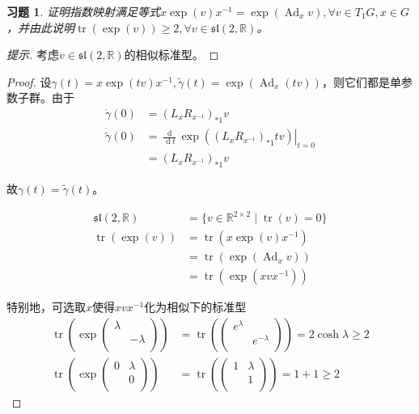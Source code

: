 \documentclass[winfonts,UTF8,c5size,a4paper,fancyhdr,hyperref,titlepage,nocap]{ctexart}
\newtheorem{xiti}{习题}
\theoremstyle{definition}
\theoremstyle{remark}
\numberwithin{equation}{subsection}
\newcommand{\Real}{\mathbb{R}}
\newcommand{\dt}{\frac{\operatorname{d}}{\operatorname{d}t}}
\newcommand{\tr}{\operatorname{tr}}
\newcommand{\local}[2]{\left.{#1}\right|_{#2}}%
\newcommand{\localt}[1]{\local{#1}{t=0}}%
\newcommand{\Ad}{\operatorname{Ad}}
\begin{document}
\begin{xiti}
  证明指数映射满足等式$x\exp(v)x^{-1}=\exp(\Ad_xv), \forall v\in T_1G,x\in G$，并由此说明$\tr(\exp(v))\geqslant2, \forall v\in\mathfrak{sl}(2,\Real)$。
\end{xiti}
\begin{proof}[提示]
  考虑$v\in\mathfrak{sl}(2,\Real)$的相似标准型。
\end{proof}
\begin{proof}
  设$\gamma(t)=x\exp(tv)x^{-1}, \widetilde{\gamma}(t)=\exp(\Ad_x(tv))$，则它们都是单参数子群。由于
  \begin{align*}
     \dot{\gamma}(0)&=(L_{x}R_{x^{-1}})_{\ast1}v\\
     \dot{\widetilde{\gamma}}(0)&=\localt{\dt\exp((L_{x}R_{x^{-1}})_{\ast1}tv)}\\
                            &=(L_{x}R_{x^{-1}})_{\ast1}v
  \end{align*}

  故$\gamma(t)=\widetilde{\gamma}(t)$。

  \begin{align*}
    \mathfrak{sl}(2,\Real)&=\{v\in\Real^{2\times 2}\mid\tr(v)=0\}\\
    \tr(\exp(v))&=\tr(x\exp(v)x^{-1})\\
                    &=\tr(\exp(\Ad_xv))\\
                    &=\tr(\exp(xvx^{-1}))
  \end{align*}

  特别地，可选取$x$使得$xvx^{-1}$化为相似下的标准型
  \begin{align*}
    \tr(\exp\begin{pmatrix}
       \lambda &  \\
        & -\lambda \\
     \end{pmatrix})
     &=\tr(\begin{pmatrix}
        e^{\lambda} &  \\
         & e^{-\lambda} \\
      \end{pmatrix})
      =2\cosh\lambda\geqslant2\\
    \tr(\exp\begin{pmatrix}
       0 & \lambda \\
        & 0 \\
     \end{pmatrix})
     &=\tr(\begin{pmatrix}
        1 & \lambda \\
         & 1 \\
      \end{pmatrix})
      =1+1\geqslant2
  \end{align*}
\end{proof}
\end{document}
